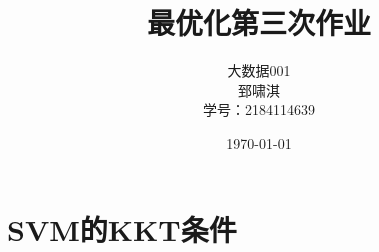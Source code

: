 \documentclass[12pt, a4paper, oneside, fontset=windows]{ctexart}
\title{\textbf{最优化第三次作业}}
\author{大数据001\\郅啸淇\\学号：2184114639}
\date{\today}
\begin{document}
\maketitle
\newpage
\tableofcontents
\newpage

\section{SVM的KKT条件}
\end{document}
